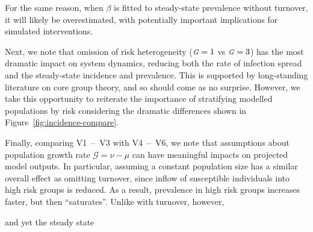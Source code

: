 \documentclass[10pt]{article}
\numberwithin{equation}{section}
\newcommand{\N}{{\mbox{\footnotesize{\textit{N}}}}}
\newcommand{\G}{{\mbox{\footnotesize{\textit{G}}}}}
\newcommand{\fig}[1]{Figure~\ref{#1}}
\begin{document}
For the same reason, when $\beta$ is fitted to steady-state prevalence without turnover,
it will likely be overestimated,
with potentially important implications for simulated interventions.
\par
Next, we note that omission of risk heterogeneity ($\G = 1$ vs $\G = 3$)
has the most dramatic impact on system dynamics,
reducing both the rate of infection spread and the steady-state incidence and prevalence.
This is supported by long-standing literature on core group theory,
and so should come as no surprise.
However, we take this opportunity to reiterate the importance of
stratifying modelled populations by risk
considering the dramatic differences shown in \fig{fig:incidence-compare}.
\par
Finally, comparing V1~--~V3 with V4~--~V6, we note that
assumptions about population growth rate $\mathcal{G} = \nu - \mu$
can have meaningful impacts on projected model outputs.
In particular, assuming a constant population size
has a similar overall effect as omitting turnover,
since inflow of susceptible individuals into high risk groups is reduced.
As a result, prevalence in high risk groups increases faster,
but then ``saturates''.
Unlike with turnover, however,

and yet the steady state
\end{document}

